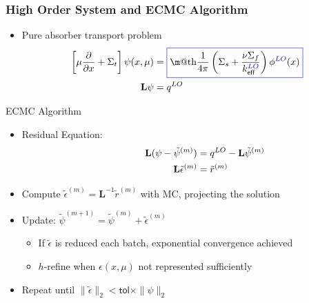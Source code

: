 \documentclass[xcolor=dvipsnames]{beamer}
\makeatletter
\newcommand*{\boxedcolor}{blue}
\renewcommand{\boxed}[1]{\textcolor{\boxedcolor}{%
  \fbox{\normalcolor\m@th$\displaystyle#1$}}}
\newcommand{\keff}[0]{\ensuremath{{k}_{\textsf{eff}}} }
\newcommand{\colb}[1]{{\color{blue} #1}}
\newlength{\wideitemsep}
\let\olditem\item
\renewcommand{\item}{\setlength{\itemsep}{\wideitemsep}\olditem}
\newcommand{\pderiv}[2]{\frac{\partial #1}{\partial #2}}
\newcommand{\B}[1]{\ensuremath{\mathbf{#1}}}
\makeatother
\begin{document}
\begin{frame}
    \frametitle{High Order System and ECMC Algorithm}
    \begin{itemize}
        \item \colb{Pure absorber} transport problem
        \begin{align*}
            \left[\mu \pderiv{}{x} + \Sigma_t\right]\psi(x,\mu)
            &= \boxed{\frac{1}{4\pi}\left(\Sigma_s + \frac{\nu
    \Sigma_f}{\keff^{\colb{LO}}}\right)
        {\phi^{\colb{LO}}(x)}} \\ 
         \B L \psi &= q^{LO}
     \end{align*}
        \vspace{-0.3in}
        \end{itemize}\pause
        \begin{block}{ECMC Algorithm}
         \begin{itemize}
             \item Residual Equation: \vspace{-0.33in}
                 \begin{align*} 
                     \hspace{0.5in}\displaystyle \B L (\psi - \tilde\psi^{(m)}) &=  q^{LO} - \B L \tilde\psi^{(m)} \\
                     \B L \tilde\epsilon^{(m)} &= \tilde r ^{(m)} 
        \end{align*}
            \vspace{-0.3451in} \pause
        \item Compute $\tilde{\epsilon}^{(m)} = \B L^{-1} \tilde{r}^{(m)}$ with MC,
            \colb{projecting} the solution  
        \item Update: $\tilde\psi^{(m+1)} = \tilde\psi^{(m)} + \tilde \epsilon^{(m)}$
        \begin{itemize}
            \item \pause If $\tilde{\epsilon}$ is reduced each batch, \colb{exponential convergence
                achieved}
            \item $h$-refine when $\epsilon(x,\mu)$ not represented sufficiently
        \end{itemize}
    \item Repeat until $\| \tilde \epsilon \|_2 < \textsf{tol}\times \| \psi \|_2$
    \end{itemize}
\end{block}

\end{frame}
\end{document}
